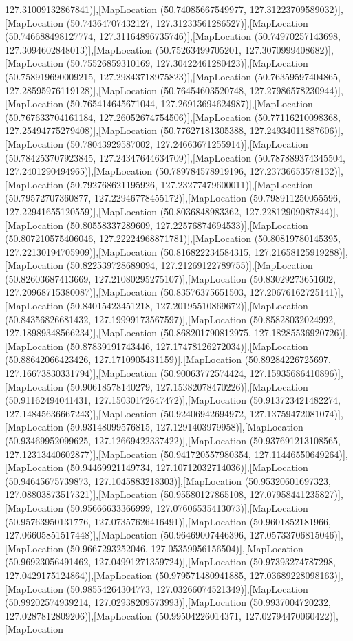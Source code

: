 127.31009132867841)],[MapLocation (50.74085667549977, 127.31223709589032)],[MapLocation (50.74364707432127, 127.31233561286527)],[MapLocation (50.746688498127774, 127.31164896735746)],[MapLocation (50.74970257143698, 127.3094602848013)],[MapLocation (50.75263499705201, 127.3070999408682)],[MapLocation (50.75526859310169, 127.30422461280423)],[MapLocation (50.758919690009215, 127.29843718975823)],[MapLocation (50.76359597404865, 127.28595976119128)],[MapLocation (50.76454603520748, 127.27986578230944)],[MapLocation (50.765414645671044, 127.26913694624987)],[MapLocation (50.767633704161184, 127.26052674754506)],[MapLocation (50.77116210098368, 127.25494775279408)],[MapLocation (50.77627181305388, 127.24934011887606)],[MapLocation (50.78043929587002, 127.24663671255914)],[MapLocation (50.784253707923845, 127.24347644634709)],[MapLocation (50.787889374345504, 127.2401290494965)],[MapLocation (50.789784578919196, 127.23736653578132)],[MapLocation (50.792768621195926, 127.23277479600011)],[MapLocation (50.79572707360877, 127.22946778455172)],[MapLocation (50.798911250055596, 127.22941655120559)],[MapLocation (50.8036848983362, 127.22812909087844)],[MapLocation (50.80558337289609, 127.22576874694533)],[MapLocation (50.807210575406046, 127.22224968871781)],[MapLocation (50.80819780145395, 127.22130194705909)],[MapLocation (50.816822234584315, 127.21658125919288)],[MapLocation (50.822539728689094, 127.21269122789755)],[MapLocation (50.82603687413669, 127.21080295275107)],[MapLocation (50.83029273651602, 127.20968715380087)],[MapLocation (50.83576375651503, 127.20676162725141)],[MapLocation (50.84015423451218, 127.20195510869672)],[MapLocation (50.84356826681432, 127.19999173567597)],[MapLocation (50.85828032024992, 127.18989348566234)],[MapLocation (50.868201790812975, 127.18285536920726)],[MapLocation (50.87839191743446, 127.17478126272034)],[MapLocation (50.88642066423426, 127.1710905431159)],[MapLocation (50.89284226725697, 127.16673830331794)],[MapLocation (50.90063772574424, 127.15935686410896)],[MapLocation (50.90618578140279, 127.15382078470226)],[MapLocation (50.91162494041431, 127.15030172647472)],[MapLocation (50.913723421482274, 127.14845636667243)],[MapLocation (50.92406942694972, 127.13759472081074)],[MapLocation (50.93148099576815, 127.1291403979958)],[MapLocation (50.93469952099625, 127.12669422337422)],[MapLocation (50.937691213108565, 127.12313440602877)],[MapLocation (50.941720557980354, 127.11446550649264)],[MapLocation (50.94469921149734, 127.10712032714036)],[MapLocation (50.94645675739873, 127.1045883218303)],[MapLocation (50.95320601697323, 127.08803873517321)],[MapLocation (50.95580127865108, 127.07958441235827)],[MapLocation (50.95666633366999, 127.07606535413073)],[MapLocation (50.95763950131776, 127.07357626416491)],[MapLocation (50.9601852181966, 127.06605851517448)],[MapLocation (50.96469007446396, 127.05733706815046)],[MapLocation (50.9667293252046, 127.05359956156504)],[MapLocation (50.96923056491462, 127.04991271359724)],[MapLocation (50.97393274787298, 127.0429175124864)],[MapLocation (50.979571480941885, 127.03689228098163)],[MapLocation (50.98554264304773, 127.03266074521349)],[MapLocation (50.99202574939214, 127.02938209573993)],[MapLocation (50.9937004720232, 127.0287812809206)],[MapLocation (50.99504226014371, 127.02794470060422)],[MapLocation 